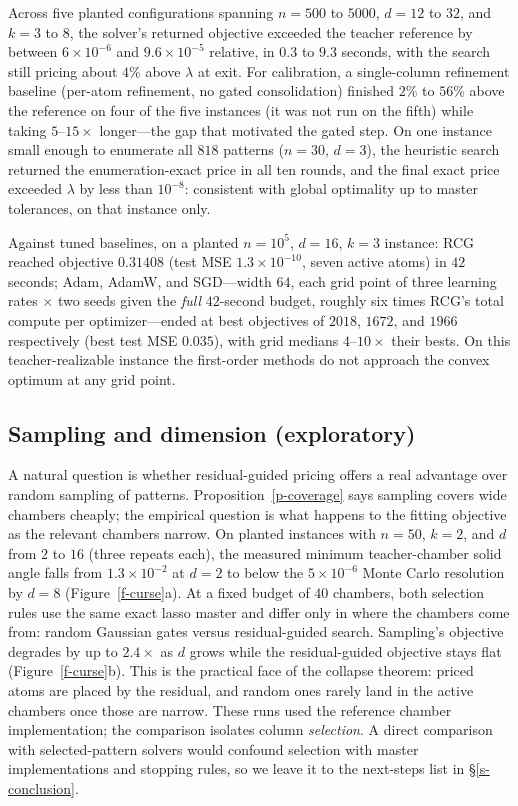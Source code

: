 \documentclass[12pt]{article}
\theoremstyle{plain}
\theoremstyle{definition}
\begin{document}
Across five planted configurations spanning $n=500$ to $5000$, $d=12$ to
$32$, and $k=3$ to $8$, the solver's returned objective exceeded the teacher
reference by between $6\times10^{-6}$ and $9.6\times10^{-5}$ relative, in
$0.3$ to $9.3$ seconds, with the search still pricing about $4\%$ above
$\lambda$ at exit. For calibration, a single-column refinement baseline
(per-atom refinement, no gated consolidation)
finished $2\%$ to $56\%$ above the reference on four of the five instances
(it was not run on the fifth) while taking $5$--$15\times$ longer---the gap that motivated the gated step. On one
instance small enough to enumerate all $818$ patterns ($n=30$, $d=3$), the
heuristic search returned the enumeration-exact price in all ten rounds, and
the final exact price exceeded $\lambda$ by less than $10^{-8}$: consistent
with global optimality up to master tolerances, on that instance only.

Against tuned baselines, on a planted $n=10^5$, $d=16$, $k=3$ instance: RCG
reached objective $0.31408$ (test MSE $1.3\times10^{-10}$, seven active
atoms) in $42$ seconds; Adam, AdamW, and SGD---width $64$, each grid point of
three learning rates $\times$ two seeds given the \emph{full} $42$-second
budget, roughly six times RCG's total compute per optimizer---ended at best
objectives of $2018$, $1672$, and $1966$ respectively (best test MSE
$0.035$), with grid medians $4$--$10\times$ their bests. On this
teacher-realizable instance the first-order methods do not approach the
convex optimum at any grid point.

\subsection{Sampling and dimension (exploratory)}\label{s-exp-curse}

A natural question is whether residual-guided pricing offers a real advantage
over random sampling of patterns. Proposition~\ref{p-coverage} says sampling
covers wide chambers cheaply; the empirical question is what happens to the
fitting objective as the relevant chambers narrow. On planted instances with
$n=50$, $k=2$, and $d$ from $2$ to $16$ (three repeats each), the measured
minimum teacher-chamber solid angle falls from $1.3\times10^{-2}$ at $d=2$ to
below the $5\times10^{-6}$ Monte Carlo resolution by $d=8$
(Figure~\ref{f-curse}a). At a fixed budget of $40$ chambers, both selection
rules use the same exact lasso master and differ only in where the chambers
come from: random Gaussian gates versus residual-guided search. Sampling's
objective degrades by up to $2.4\times$ as $d$ grows while the
residual-guided objective stays flat (Figure~\ref{f-curse}b). This is the
practical face of the collapse theorem: priced atoms are placed by the
residual, and random ones rarely land in the active chambers once those are
narrow. These runs used the reference chamber implementation; the comparison
isolates column \emph{selection}. A direct comparison with selected-pattern
solvers would confound selection with master implementations and stopping rules, so we
leave it to the next-steps list in \S\ref{s-conclusion}.
\end{document}
